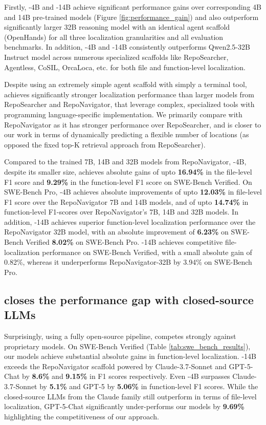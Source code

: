 Firstly, \methodname-4B and \methodname-14B achieve significant performance gains over corresponding 4B and 14B pre-trained models (Figure \ref{fig:performance_gain}) and also outperform significantly larger 32B reasoning model with an identical agent scaffold (OpenHands) for all three localization granularities and all evaluation benchmarks. In addition, \methodname-4B and \methodname-14B consistently outperforms Qwen2.5-32B Instruct model across numerous specialized scaffolds like RepoSearcher, Agentless, CoSIL, OrcaLoca, etc. for both file and function-level localization.

Despite using an extremely simple agent scaffold with simply a terminal tool, \methodname achieves significantly stronger localization performance than larger models from RepoSearcher and RepoNavigator, that leverage complex, specialized tools with programming language-specific implementation. We primarily compare with RepoNavigator as it has stronger performance over RepoSearcher, and is closer to our work in terms of dynamically predicting a flexible number of locations (as opposed the fixed top-K retrieval approach from RepoSearcher). 

Compared to the trained 7B, 14B and 32B models from RepoNavigator, \methodname-4B, despite its smaller size, achieves absolute gains of upto \textbf{16.94\%} in the file-level F1 score and \textbf{9.29\%} in the function-level F1 score on SWE-Bench Verified. On SWE-Bench Pro, \methodname-4B achieves absolute improvements of upto \textbf{12.03\%} in file-level F1 score over the RepoNavigator 7B and 14B models, and of upto \textbf{14.74\%} in function-level F1-scores over RepoNavigator's 7B, 14B and 32B models. In addition, \methodname-14B achieves superior function-level localization performance over the RepoNavigator 32B model, with an absolute improvement of \textbf{6.23\%} on SWE-Bench Verified \textbf{8.02\%} on SWE-Bench Pro. \methodname-14B achieves competitive file-localization performance on SWE-Bench Verified, with a small absolute gain of 0.82\%, whereas it underperforms RepoNavigator-32B by 3.94\% on SWE-Bench Pro.

\subsection{\methodname closes the performance gap with closed-source LLMs}Surprisingly, using a fully open-source pipeline, \methodname competes strongly against proprietary models. On SWE-Bench Verified (Table \ref{tab:swe_bench_results}), our models achieve substantial absolute gains in function-level localization. \methodname-14B exceeds the RepoNavigator scaffold powered by Claude-3.7-Sonnet and GPT-5-Chat by \textbf{8.6\%} and \textbf{9.15\%} in F1 scores respectively. Even \methodname-4B surpasses Claude-3.7-Sonnet by \textbf{5.1\%} and GPT-5 by \textbf{5.06\%} in function-level F1 scores. While the closed-source LLMs from the Claude family still outperform \methodname in terms of file-level localization, GPT-5-Chat significantly under-performs our models by \textbf{9.69\%} highlighting the competitiveness of our approach.


